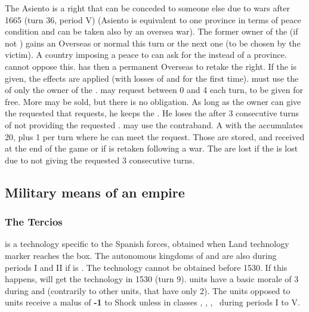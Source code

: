  The Asiento is a right that can
be conceded to someone else due to wars after 1665 (turn 36, period V)
(Asiento is equivalent to one province in terms of peace condition and
can be taken also by an oversea war). The former owner of the
 (if not \SPA) gains an Overseas or normal \CB this turn
or the next one (to be chosen by the victim).
\bparag A country imposing a peace to \SPA can ask for the
 instead of a province. \SPA cannot oppose this. \SPA has
then a permanent Overseas \CB to retake the  right.
\bparag If the  is given, the 
effects are applied (with losses of \VP and \STAB for the first time).
\bparag \SPA must use the  of only the owner of the
. \SPA may request between 0 and 4  each
turn, to be given for free. More may be sold, but there is no
obligation. As long as the  owner can give the requested
 that \SPA requests, he keeps the . He loses
the  after 3 consecutive turns of not providing the
requested .
\bparag \SPA may use the  contraband.
 A \MAJ with the  accumulates
20\VP, plus 1 per turn where he can meet the  request. Those
\VP are stored, and received at the end of the game or if
 is retaken following a war. The \VP are lost if the
 is lost due to not giving the requested  3
consecutive turns.



\subsection{Military means of an empire}


\subsubsection{The Tercios}
\aparag \TTER is a technology specific to the Spanish forces, obtained
when \SPA Land technology marker reaches the \TTER box.
\bparag The autonomous kingdoms of  and  are
also \TTER during periods I and II if \SPA is \TTER.
\bparag The technology \TTER cannot be obtained before 1530. If this
happens, \SPA will get the \TTER technology in 1530 (turn 9).
\bparag \TTER units have a basic morale of 3 during \TREN and \TARQ
(contrarily to other units, that have only 2).
\bparag The units opposed to \TTER units receive a malus of {\bf -1} to
Shock unless in classes \CAI, \CAIM, \CAII, \CAIIM\ during periods I to
V.

